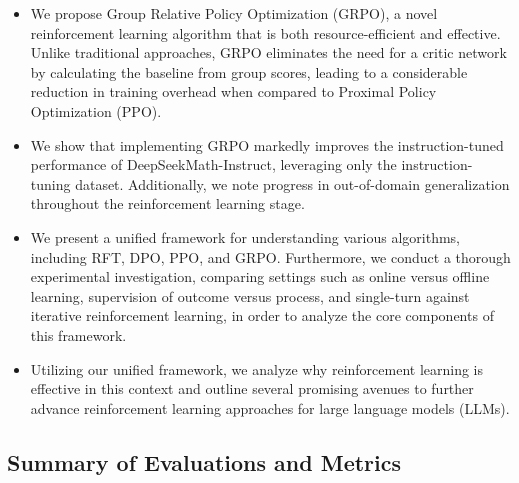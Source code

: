 \begin{itemize}[topsep=0pt]
    \item We propose Group Relative Policy Optimization (GRPO), a novel reinforcement learning algorithm that is both resource-efficient and effective. Unlike traditional approaches, GRPO eliminates the need for a critic network by calculating the baseline from group scores, leading to a considerable reduction in training overhead when compared to Proximal Policy Optimization (PPO).
    \item We show that implementing GRPO markedly improves the instruction-tuned performance of DeepSeekMath-Instruct, leveraging only the instruction-tuning dataset. Additionally, we note progress in out-of-domain generalization throughout the reinforcement learning stage.
    \item We present a unified framework for understanding various algorithms, including RFT, DPO, PPO, and GRPO. Furthermore, we conduct a thorough experimental investigation, comparing settings such as online versus offline learning, supervision of outcome versus process, and single-turn against iterative reinforcement learning, in order to analyze the core components of this framework.
    \item Utilizing our unified framework, we analyze why reinforcement learning is effective in this context and outline several promising avenues to further advance reinforcement learning approaches for large language models (LLMs).
\end{itemize}

\subsection{Summary of Evaluations and Metrics}

